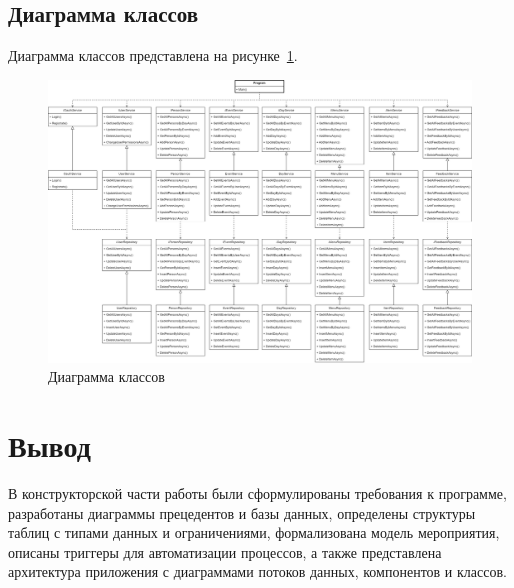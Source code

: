 \subsection{Диаграмма классов}

Диаграмма классов представлена на рисунке~\ref{fig:class-diagram}.

\begin{figure}[h]
	\centering
	\includegraphics[width=1\textwidth]{images/uml-classes.png}
	\caption{Диаграмма классов} 
	\label{fig:class-diagram} 
\end{figure}

\section{Вывод}

В конструкторской части работы были сформулированы требования к программе, разработаны диаграммы прецедентов и базы данных, определены структуры таблиц с типами данных и ограничениями, формализована модель мероприятия, описаны триггеры для автоматизации процессов, а также представлена архитектура приложения с диаграммами потоков данных, компонентов и классов.

\clearpage
